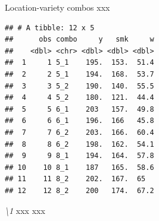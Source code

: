 \documentclass[ignorenonframetext,]{beamer}
\newenvironment{Shaded}{\begin{snugshade}}{\end{snugshade}}
\newcommand{\KeywordTok}[1]{\textcolor[rgb]{0.13,0.29,0.53}{\textbf{#1}}}
\newcommand{\NormalTok}[1]{#1}
\newcommand{\OperatorTok}[1]{\textcolor[rgb]{0.81,0.36,0.00}{\textbf{#1}}}
\newcommand{\StringTok}[1]{\textcolor[rgb]{0.31,0.60,0.02}{#1}}
\begin{document}
\begin{frame}[fragile]{Location-variety combos xxx}
\protect\hypertarget{location-variety-combos-xxx}{}

\footnotesize

\begin{Shaded}
\end{Shaded}

\begin{verbatim}
## # A tibble: 12 x 5
##      obs combo     y   smk     w
##    <dbl> <chr> <dbl> <dbl> <dbl>
##  1     1 5_1    195.  153.  51.4
##  2     2 5_1    194.  168.  53.7
##  3     3 5_2    190.  140.  55.5
##  4     4 5_2    180.  121.  44.4
##  5     5 6_1    203   157.  49.8
##  6     6 6_1    196.  166   45.8
##  7     7 6_2    203.  166.  60.4
##  8     8 6_2    198.  162.  54.1
##  9     9 8_1    194.  164.  57.8
## 10    10 8_1    187   165.  58.6
## 11    11 8_2    202.  167.  65  
## 12    12 8_2    200   174.  67.2
\end{verbatim}

\emph{\textbackslash{}1} xxx xxx \normalsize

\end{frame}
\end{document}
